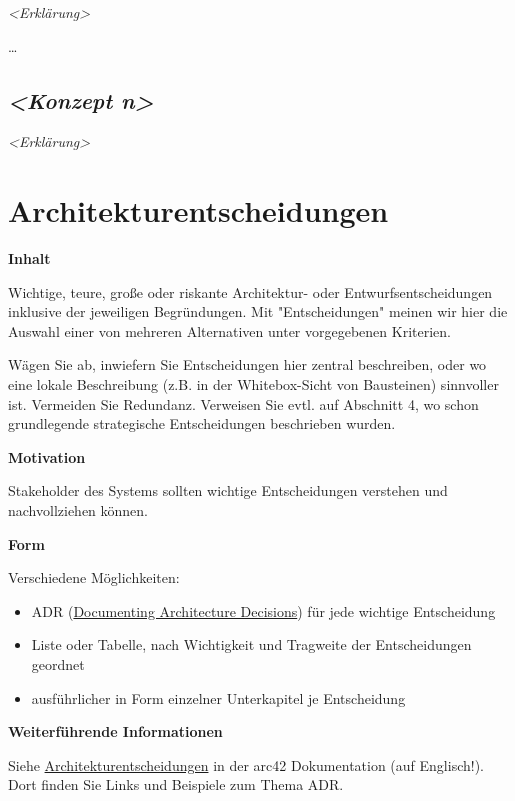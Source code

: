 \documentclass[a4paper,12pt]{article}
\begin{document}
\emph{\textless Erklärung\textgreater{}}

\ldots\hspace{0pt}

\subsection{\texorpdfstring{\emph{\textless Konzept
n\textgreater{}}}{\textless Konzept n\textgreater{}}}\label{_konzept_n}

\emph{\textless Erklärung\textgreater{}}
\newpage
\section{Architekturentscheidungen}\label{section-design-decisions}

\textbf{Inhalt}

Wichtige, teure, große oder riskante Architektur- oder
Entwurfsentscheidungen inklusive der jeweiligen Begründungen. Mit
"Entscheidungen" meinen wir hier die Auswahl einer von mehreren
Alternativen unter vorgegebenen Kriterien.

Wägen Sie ab, inwiefern Sie Entscheidungen hier zentral beschreiben,
oder wo eine lokale Beschreibung (z.B. in der Whitebox-Sicht von
Bausteinen) sinnvoller ist. Vermeiden Sie Redundanz. Verweisen Sie evtl.
auf Abschnitt 4, wo schon grundlegende strategische Entscheidungen
beschrieben wurden.

\textbf{Motivation}

Stakeholder des Systems sollten wichtige Entscheidungen verstehen und
nachvollziehen können.

\textbf{Form}

Verschiedene Möglichkeiten:

\begin{itemize}
\item
  ADR
  (\href{https://cognitect.com/blog/2011/11/15/documenting-architecture-decisions}{Documenting
  Architecture Decisions}) für jede wichtige Entscheidung
\item
  Liste oder Tabelle, nach Wichtigkeit und Tragweite der Entscheidungen
  geordnet
\item
  ausführlicher in Form einzelner Unterkapitel je Entscheidung
\end{itemize}

\textbf{Weiterführende Informationen}

Siehe
\href{https://docs.arc42.org/section-9/}{Architekturentscheidungen} in
der arc42 Dokumentation (auf Englisch!). Dort finden Sie Links und
Beispiele zum Thema ADR.
\newpage
\end{document}
